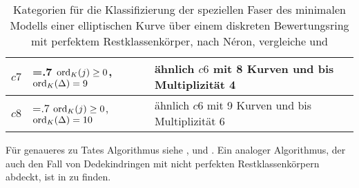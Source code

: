 \begin{table}[tbhp]
\begin{center}
\begin{tabularx}{\linewidth}{@{}l>{\hsize=.7\hsize}X>{\hsize=1.3\hsize}X@{}}
      $c7$& $\operatorname{ord}_{K}(j)\geq0$, $\operatorname{ord}_{K}(\Delta)=9$
      & ähnlich $c6$ mit 8 Kurven und bis Multiplizität 4 \\\midrule
      $c8$& $\operatorname{ord}_{K}(j)\geq0$, $\operatorname{ord}_{K}(\Delta)=10$
      & ähnlich $c6$ mit 9 Kurven und bis Multiplizität 6\\\bottomrule
    \end{tabularx}
  \end{center}
  \caption{\label{tab:faserklassifizierung} Kategorien für die
    Klassifizierung der speziellen Faser des minimalen Modells einer
    elliptischen Kurve über einem diskreten Bewertungsring mit
    perfektem Restklassenkörper,
    nach Néron,
    vergleiche \cite[Chapter 1.5]{neron} und \cite[Figure IV.4.4]{silverman2}} 
\end{table}
Für genaueres zu Tates Algorithmus siehe
\cite[Chapter IV.9]{silverman2},
\cite[Chapter 1.5]{neron} und \cite{tate}.
Ein analoger Algorithmus, der auch den Fall von Dedekindringen mit
nicht perfekten Restklassenkörpern abdeckt, ist in \cite{nonperfect}
zu finden.


